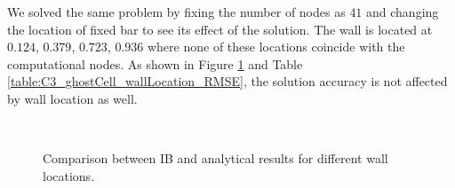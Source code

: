 We solved the same problem by fixing the number of nodes as $41$ and changing the location of fixed bar to see its effect of the solution. The wall is located at $0.124$, $0.379$, $0.723$, $0.936$ where none of these locations coincide with the computational nodes. As shown in Figure \ref{fig:C3_ghostCell_wallLocation} and Table \ref{table:C3_ghostCell_wallLocation_RMSE}, the solution accuracy is not affected by wall location as well.

\begin{figure}[H]
    \centering
    \quad
    \\
    \quad
    \caption{Comparison between IB and analytical results for different wall locations.}
    \label{fig:C3_ghostCell_wallLocation}
\end{figure}

